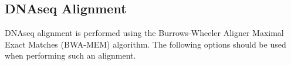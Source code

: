 \subsection{DNAseq Alignment}
DNAseq alignment is performed using the Burrows-Wheeler Aligner Maximal Exact Matches (BWA-MEM) algorithm. The following options should be used when performing such an alignment.


